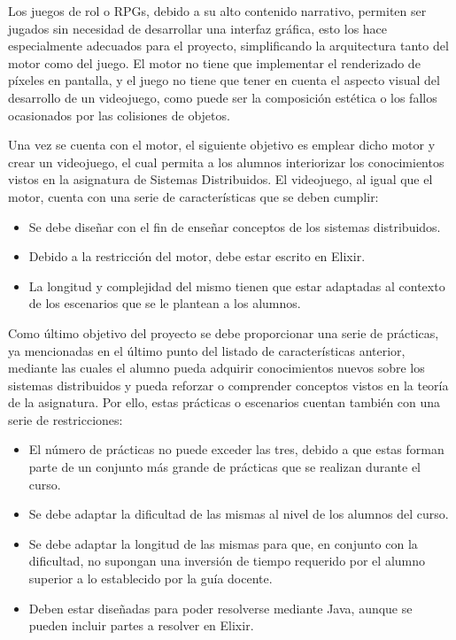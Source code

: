 Los juegos de rol o RPGs, debido a su alto contenido narrativo, permiten ser jugados sin necesidad de desarrollar una interfaz gráfica, esto los hace especialmente adecuados para el proyecto, simplificando la arquitectura tanto del motor como del juego. El motor no tiene que implementar el renderizado de píxeles en pantalla, y el juego no tiene que tener en cuenta el aspecto visual del desarrollo de un videojuego, como puede ser la composición estética o los fallos ocasionados por las colisiones de objetos.

Una vez se cuenta con el motor, el siguiente objetivo es emplear dicho motor y crear un videojuego, el cual permita a los alumnos interiorizar los conocimientos vistos en la asignatura de Sistemas Distribuidos. El videojuego, al igual que el motor, cuenta con una serie de características que se deben cumplir:

\begin{itemize}
	\item Se debe diseñar con el fin de enseñar conceptos de los sistemas distribuidos.
	\item Debido a la restricción del motor, debe estar escrito en Elixir.
	\item La longitud y complejidad del mismo tienen que estar adaptadas al contexto de los escenarios que se le plantean a los alumnos.
\end{itemize}

Como último objetivo del proyecto se debe proporcionar una serie de prácticas, ya mencionadas en el último punto del listado de características anterior, mediante las cuales el alumno pueda adquirir conocimientos nuevos sobre los sistemas distribuidos y pueda reforzar o comprender conceptos vistos en la teoría de la asignatura. Por ello, estas prácticas o escenarios cuentan también con una serie de restricciones:

\begin{itemize}
	\item El número de prácticas no puede exceder las tres, debido a que estas forman parte de un conjunto más grande de prácticas que se realizan durante el curso.
	\item Se debe adaptar la dificultad de las mismas al nivel de los alumnos del curso.
	\item Se debe adaptar la longitud de las mismas para que, en conjunto con la dificultad, no supongan una inversión de tiempo requerido por el alumno superior a lo establecido por la guía docente.
	\item Deben estar diseñadas para poder resolverse mediante Java, aunque se pueden incluir partes a resolver en Elixir.
\end{itemize}

